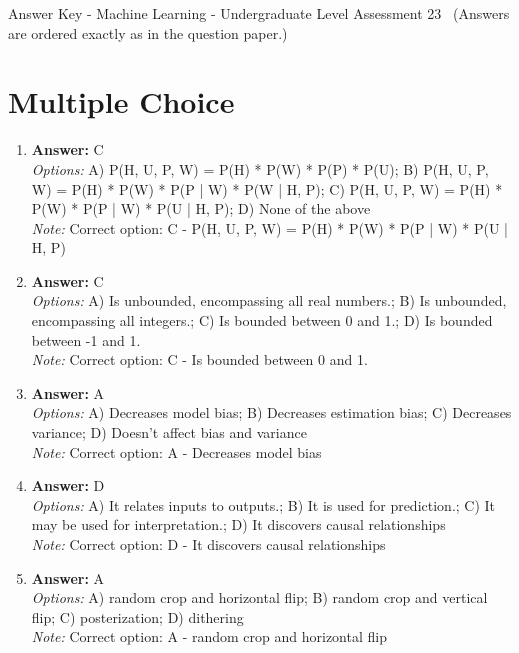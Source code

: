 \documentclass[12pt]{article}
\begin{document}
\begin{center}
Answer Key - Machine Learning - Undergraduate Level Assessment 23 \
\small (Answers are ordered exactly as in the question paper.)
\end{center}

\section*{Multiple Choice}
\begin{enumerate}[label=\arabic*.]
\item \textbf{Answer:} C
\\ \textit{Options:} A) P(H, U, P, W) = P(H) * P(W) * P(P) * P(U); B) P(H, U, P, W) = P(H) * P(W) * P(P | W) * P(W | H, P); C) P(H, U, P, W) = P(H) * P(W) * P(P | W) * P(U | H, P); D) None of the above
\\ \textit{Note:} Correct option: C - P(H, U, P, W) = P(H) * P(W) * P(P | W) * P(U | H, P)
\item \textbf{Answer:} C
\\ \textit{Options:} A) Is unbounded, encompassing all real numbers.; B) Is unbounded, encompassing all integers.; C) Is bounded between 0 and 1.; D) Is bounded between -1 and 1.
\\ \textit{Note:} Correct option: C - Is bounded between 0 and 1.
\item \textbf{Answer:} A
\\ \textit{Options:} A) Decreases model bias; B) Decreases estimation bias; C) Decreases variance; D) Doesn't affect bias and variance
\\ \textit{Note:} Correct option: A - Decreases model bias
\item \textbf{Answer:} D
\\ \textit{Options:} A) It relates inputs to outputs.; B) It is used for prediction.; C) It may be used for interpretation.; D) It discovers causal relationships
\\ \textit{Note:} Correct option: D - It discovers causal relationships
\item \textbf{Answer:} A
\\ \textit{Options:} A) random crop and horizontal flip; B) random crop and vertical flip; C) posterization; D) dithering
\\ \textit{Note:} Correct option: A - random crop and horizontal flip
\end{enumerate}
\end{document}
